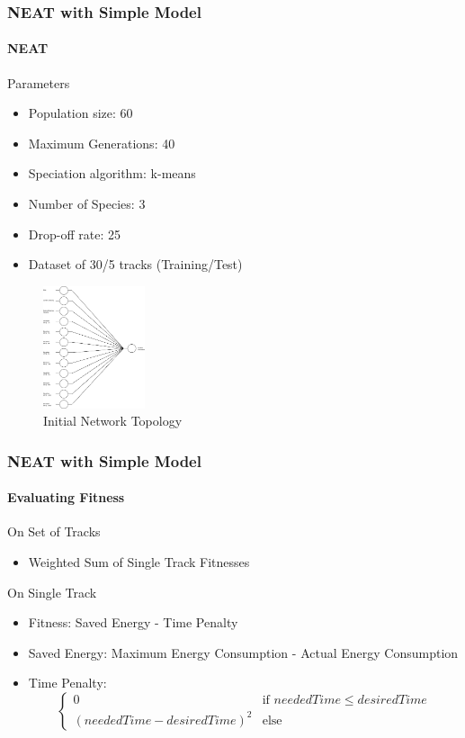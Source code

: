\documentclass[8pt]{beamer}
\begin{document}
\begin{frame}
	\frametitle{NEAT with Simple Model}
	\framesubtitle{NEAT}
	\begin{block}{Parameters}
		\begin{itemize}
			\item Population size: 60
			\item Maximum Generations: 40
			\item Speciation algorithm: k-means
			\item Number of Species: 3
			\item Drop-off rate: 25
			\item Dataset of 30/5 tracks (Training/Test)
		\end{itemize}
	\end{block}
	\begin{figure}[c]	
		\includegraphics[width=3cm]{images/topology.jpeg}
		\caption{Initial Network Topology}
	\end{figure}
\end{frame}

\begin{frame}
	\frametitle{NEAT with Simple Model}
	\framesubtitle{Evaluating Fitness}
	\begin{block}{On Set of Tracks}
		\begin{itemize}
			\item Weighted Sum of Single Track Fitnesses
		\end{itemize}
	\end{block}
	\pause
	\begin{block}{On Single Track}
		\begin{itemize}		
			\item Fitness: Saved Energy - Time Penalty
			\item Saved Energy: Maximum Energy Consumption - Actual Energy Consumption
			\item Time Penalty: \[\left\{ 
				\begin{array}{ll}
					0  & \mbox{if } neededTime \leq desiredTime \\
					(neededTime - desiredTime)^2 & \mbox{else } 
				\end{array}			
			\right. \]			
		\end{itemize}
	\end{block}	
\end{frame}
\end{document}
